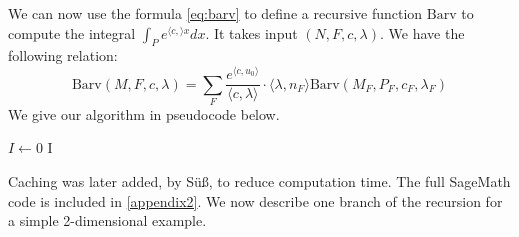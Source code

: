 We can now use the formula \ref{eq:barv} to define a recursive function \(\text{Barv}\) to compute the integral \(\int_P e^{ \langle c , \rangle x} dx\). It takes input \((N,F,c,\lambda)\). We have the following relation:
\[
\text{Barv}(M,F,c,\lambda) = \sum_F \frac{e^{\langle c, u_0 \rangle} }{\langle c, \lambda \rangle} \cdot \langle \lambda, n_F \rangle \text{Barv}(M_F, P_F,c_F,\lambda_F)
\]
We give our algorithm in pseudocode below.
\IncMargin{1em}
\begin{algorithm}[h] \label{alg1}
\BlankLine
\(I \leftarrow 0\)\;
\Return I
\caption{\(\text{Barv}(M,P,c,\lambda)\)}\label{algo_disjdecomp}
\end{algorithm}
Caching was later added, by S\"u\ss, to reduce computation time. The full SageMath code is included in \ref{appendix2}.
\newpage
We now describe one branch of the recursion for a simple 2-dimensional example. 
